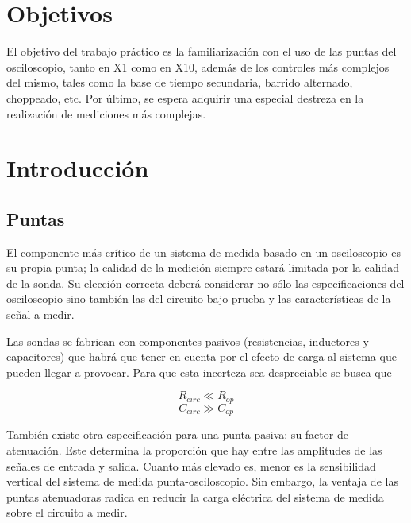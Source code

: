 \documentclass{article}
\begin{document}
\section{Objetivos}

	El objetivo del trabajo práctico es la familiarización con el uso de las puntas del osciloscopio, tanto en X1 como en X10, además de los controles más complejos del mismo, tales como la base de tiempo secundaria, barrido alternado, choppeado, etc. Por último, se espera adquirir una especial destreza en la realización de mediciones más complejas.
\bigskip\bigskip




\section{Introducción}
\medskip

\subsection{Puntas}

	El componente más crítico de un sistema de medida basado en un osciloscopio es su propia punta; la calidad de la medición siempre estará limitada por la calidad de la sonda. Su elección correcta deberá considerar no sólo las especificaciones del osciloscopio sino también  las del circuito bajo prueba y las características de la señal a medir.
	\par
	Las sondas se fabrican con componentes pasivos (resistencias, inductores y capacitores) que habrá que tener en cuenta por el efecto de carga al sistema que pueden llegar a provocar. Para que esta incerteza sea despreciable se busca que

\begin{equation*}
	R_{circ} \ll R_{op}
\end{equation*}
\begin{equation*}
	C_{circ} \gg C_{op}
\end{equation*}
\medskip

	También existe otra especificación para una punta pasiva: su factor de atenuación. Este determina la proporción que hay entre las amplitudes de las señales de entrada y salida. Cuanto más elevado es, menor es la sensibilidad vertical del sistema de medida punta-osciloscopio. Sin embargo, la ventaja de las puntas atenuadoras radica en reducir la carga eléctrica del sistema de medida sobre el circuito a medir.
\bigskip\medskip
\end{document}
